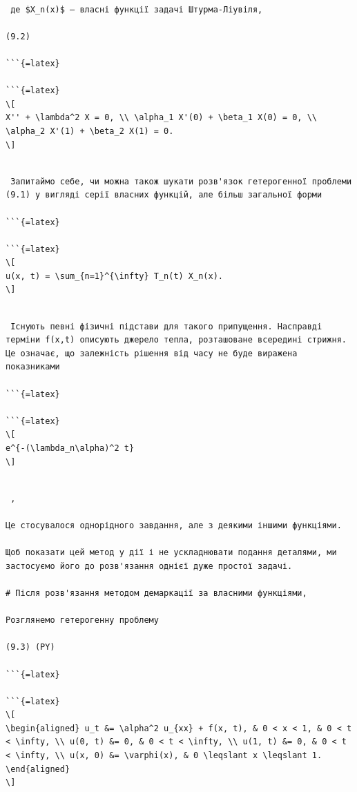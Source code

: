 \documentclass[
  ukrainian,
]{article}
\begin{document}
\begin{verbatim}

 де $X_n(x)$ — власні функції задачі Штурма-Ліувіля,

(9.2)

```{=latex}

```{=latex}
\[
X'' + \lambda^2 X = 0, \\ \alpha_1 X'(0) + \beta_1 X(0) = 0, \\ \alpha_2 X'(1) + \beta_2 X(1) = 0.
\]
\end{verbatim}

\begin{verbatim}

 Запитаймо себе, чи можна також шукати розв'язок гетерогенної проблеми (9.1) у вигляді серії власних функцій, але більш загальної форми

```{=latex}

```{=latex}
\[
u(x, t) = \sum_{n=1}^{\infty} T_n(t) X_n(x).
\]
\end{verbatim}

\begin{verbatim}

 Існують певні фізичні підстави для такого припущення. Насправді терміни f(x,t) описують джерело тепла, розташоване всередині стрижня. Це означає, що залежність рішення від часу не буде виражена показниками

```{=latex}

```{=latex}
\[
e^{-(\lambda_n\alpha)^2 t}
\]
\end{verbatim}

\begin{verbatim}

 ,

Це стосувалося однорідного завдання, але з деякими іншими функціями.

Щоб показати цей метод у дії і не ускладнювати подання деталями, ми застосуємо його до розв'язання однієї дуже простої задачі.

# Після розв'язання методом демаркації за власними функціями,

Розглянемо гетерогенну проблему

(9.3) (PY)

```{=latex}

```{=latex}
\[
\begin{aligned} u_t &= \alpha^2 u_{xx} + f(x, t), & 0 < x < 1, & 0 < t < \infty, \\ u(0, t) &= 0, & 0 < t < \infty, \\ u(1, t) &= 0, & 0 < t < \infty, \\ u(x, 0) &= \varphi(x), & 0 \leqslant x \leqslant 1. \end{aligned}
\]
\end{verbatim}
\end{document}
